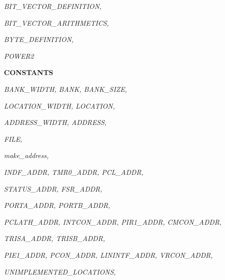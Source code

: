\begin{sloppypar}
\hspace*{0.20in}\it BIT\_VECTOR\_DEFINITION\rm ,

\hspace*{0.20in}\it BIT\_VECTOR\_ARITHMETICS\rm ,

\hspace*{0.20in}\it BYTE\_DEFINITION\rm ,

\vspace*{4mm}
\hspace*{0.20in}\it POWER2

\vspace*{4mm}
\bf CONSTANTS

\hspace*{0.20in}\it BANK\_WIDTH\rm , \it BANK\rm , \it BANK\_SIZE\rm ,

\hspace*{0.20in}\it LOCATION\_WIDTH\rm , \it LOCATION\rm ,

\hspace*{0.20in}\it ADDRESS\_WIDTH\rm , \it ADDRESS\rm ,

\hspace*{0.20in}\it FILE\rm ,

\hspace*{0.20in}\it make\_address\rm ,

\vspace*{4mm}
\hspace*{0.20in} 

\hspace*{0.20in}\it INDF\_ADDR\rm , \it TMR0\_ADDR\rm , \it PCL\_ADDR\rm , 

\hspace*{0.20in}\it STATUS\_ADDR\rm , \it FSR\_ADDR\rm , 

\hspace*{0.20in}\it PORTA\_ADDR\rm , \it PORTB\_ADDR\rm ,

\hspace*{0.20in}\it PCLATH\_ADDR\rm , \it INTCON\_ADDR\rm , \it PIR1\_ADDR\rm , \it CMCON\_ADDR\rm ,

\hspace*{0.20in}\it TRISA\_ADDR\rm , \it TRISB\_ADDR\rm ,

\hspace*{0.20in}\it PIE1\_ADDR\rm , \it PCON\_ADDR\rm , \it LININTF\_ADDR\rm , \it VRCON\_ADDR\rm ,

\vspace*{4mm}
\hspace*{0.20in} 

\hspace*{0.20in}\it UNIMPLEMENTED\_LOCATIONS\rm ,


\end{sloppypar}
